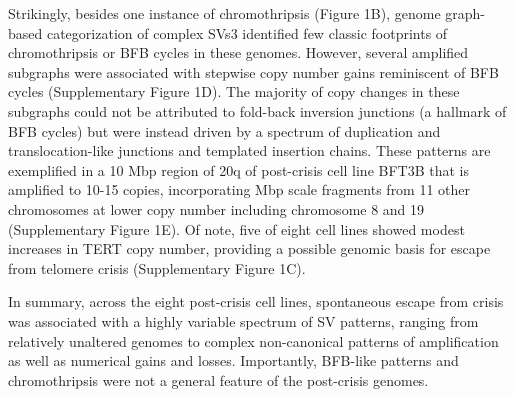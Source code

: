 \documentclass[phd,tocprelim]{cornell}
\begin{document}
Strikingly, besides one instance of chromothripsis (Figure 1B), genome graph-based categorization of complex SVs3 identified few classic footprints of chromothripsis or BFB cycles in these genomes. However, several amplified subgraphs were associated with stepwise copy number gains reminiscent of BFB cycles (Supplementary Figure 1D). The majority of copy changes in these subgraphs could not be attributed to fold-back inversion junctions (a hallmark of BFB cycles) but were instead driven by a spectrum of duplication and translocation-like junctions and templated insertion chains. These patterns are exemplified in a 10 Mbp region of 20q of post-crisis cell line BFT3B that is amplified to 10-15 copies, incorporating Mbp scale fragments from 11 other chromosomes at lower copy number including chromosome 8 and 19 (Supplementary Figure 1E). Of note, five of eight cell lines showed modest increases in TERT copy number, providing a possible genomic basis for escape from telomere crisis (Supplementary Figure 1C). 

In summary, across the eight post-crisis cell lines, spontaneous escape from crisis was associated with a highly variable spectrum of SV patterns, ranging from relatively unaltered genomes to complex non-canonical patterns of amplification as well as numerical gains and losses. Importantly, BFB-like patterns and chromothripsis were not a general feature of the post-crisis genomes. 
\end{document}
